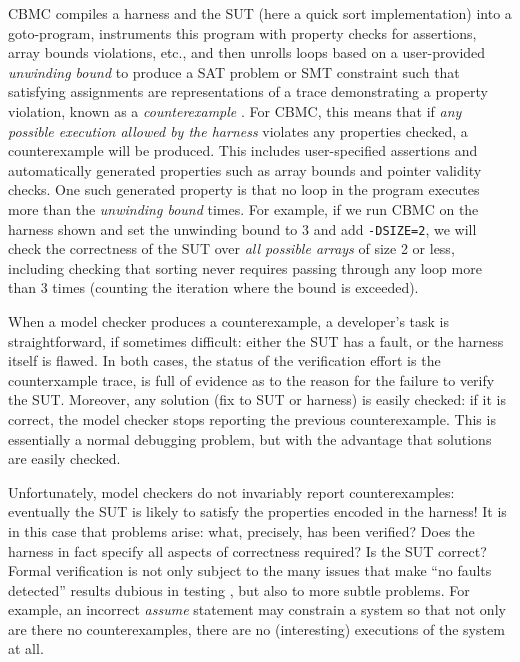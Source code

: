 \documentclass[conference]{IEEEtran}
\begin{document}
CBMC compiles a harness and the SUT (here a quick sort implementation)
into a goto-program, instruments this program with property checks for
assertions, array bounds violations, etc., and then unrolls loops
based on a user-provided \emph{unwinding bound} to produce a SAT
problem or SMT constraint such that satisfying assignments are
representations of a trace demonstrating a property violation, known
as a \emph{counterexample} \cite{CountWitness}.  For CBMC, this means
that if \emph{any possible execution allowed by the harness} violates
any properties checked, a counterexample will be produced.  This
includes user-specified assertions and automatically generated
properties such as array bounds and pointer validity checks. One such
generated property is that no loop in the program executes more than
the \emph{unwinding bound} times.  For example, if we run CBMC on the
harness shown and set the unwinding bound to 3 and add {\tt -DSIZE=2},
we will check the correctness of the SUT over \emph{all possible
  arrays} of size 2 or less, including checking that sorting never
requires passing through any loop more than 3 times (counting the
iteration where the bound is exceeded).

When a model checker produces a counterexample, a developer's task is
straightforward, if sometimes difficult: either the SUT has a fault,
or the harness itself is flawed.  In both cases, the status of the
verification effort is the counterxample trace, is full of
evidence as to the reason for the failure to verify the SUT. Moreover,
any solution (fix to SUT or harness) is easily checked: if it is
correct, the model checker stops reporting the previous
counterexample.  This is essentially a normal debugging problem, but
with the advantage that solutions are easily checked.

Unfortunately, model checkers do not invariably report
counterexamples: eventually the SUT is likely to satisfy the
properties encoded in the harness!  It is in this case that problems
arise: what, precisely, has been verified?  Does the harness in fact
specify all aspects of correctness required?  Is the SUT correct?
Formal verification is not only subject to the many issues that make
``no faults detected'' results dubious in testing \cite{WODA09,CovDisc}, but
also to more subtle problems.  For example, an incorrect \emph{assume}
statement may constrain a system so that not only are there no
counterexamples, there are no (interesting) executions of the system at
all.
\end{document}
